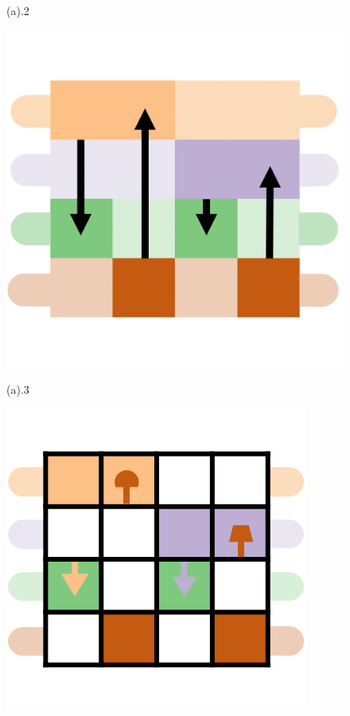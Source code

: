 \documentclass[review,journal]{vgtc}         %
\begin{document}
\begin{figure}[h]
\begin{minipage}{0.24\linewidth}
		\vspace{-1pt}
		\centerline{(a).2}
		\centerline{\includegraphics[width=\textwidth]{Fig/13.png}}
		\vspace{-1pt}
		\centerline{(a).3}
	\end{minipage}
	\begin{minipage}{0.24\linewidth}
		\centerline{\includegraphics[width=\textwidth]{Fig/21.png}}

\end{minipage}
\end{figure}
\end{document}

